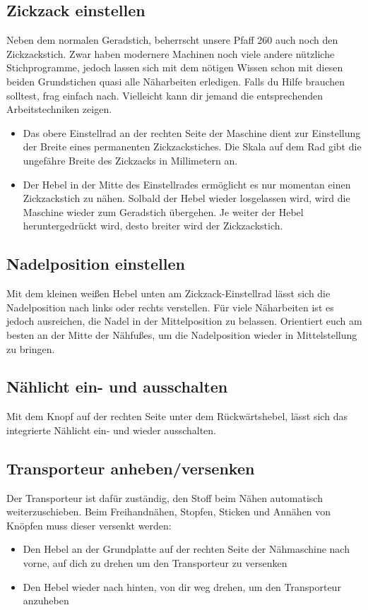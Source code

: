 \documentclass{\basedir/fablab-document}
\begin{document}
\subsection{Zickzack einstellen}
Neben dem normalen Geradstich, beherrscht unsere Pfaff 260 auch noch den Zickzackstich. 
Zwar haben modernere Machinen noch viele andere nützliche Stichprogramme, jedoch lassen sich mit dem nötigen Wissen schon mit diesen beiden Grundstichen quasi alle Näharbeiten erledigen. Falls du Hilfe brauchen solltest, frag einfach nach. Vielleicht kann dir jemand die entsprechenden Arbeitstechniken zeigen.  
\begin{itemize}
	\item Das obere Einstellrad an der rechten Seite der Maschine dient zur Einstellung der Breite eines permanenten Zickzackstiches. Die Skala auf dem Rad gibt die ungefähre Breite des Zickzacks in Millimetern an.
	\item Der Hebel in der Mitte des Einstellrades ermöglicht es nur momentan einen Zickzackstich zu nähen.
	Solbald der Hebel wieder losgelassen wird, wird die Maschine wieder zum Geradstich übergehen. 
	Je weiter der Hebel heruntergedrückt wird, desto breiter wird der Zickzackstich.
\end{itemize}

\subsection{Nadelposition einstellen}
Mit dem kleinen weißen Hebel unten am Zickzack-Einstellrad lässt sich die Nadelposition nach links oder rechts verstellen.
Für viele Näharbeiten ist es jedoch ausreichen, die Nadel in der Mittelposition zu belassen.
Orientiert euch am besten an der Mitte der Nähfußes, um die Nadelposition wieder in Mittelstellung zu bringen.

\subsection{Nählicht ein- und ausschalten}
Mit dem Knopf auf der rechten Seite unter dem Rückwärtshebel, lässt sich das integrierte Nählicht ein- und wieder ausschalten.

\subsection{Transporteur anheben/versenken}
Der Transporteur ist dafür zuständig, den Stoff beim Nähen automatisch weiterzuschieben. 
\newline Beim Freihandnähen, Stopfen, Sticken und Annähen von Knöpfen muss dieser versenkt werden:
\begin{itemize}
	\item Den Hebel an der Grundplatte auf der rechten Seite der Nähmaschine nach vorne, auf dich zu drehen um den Transporteur zu versenken
	\item Den Hebel wieder nach hinten, von dir weg drehen, um den Transporteur anzuheben
\end{itemize}
\end{document}
